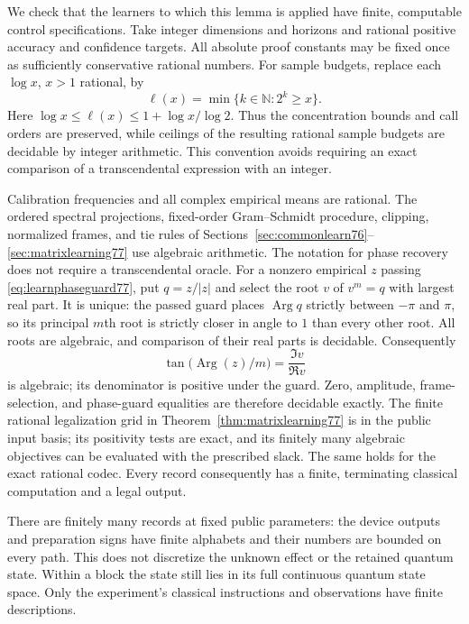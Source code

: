 We check that the learners to which this lemma is applied have
finite, computable control specifications.  Take integer dimensions
and horizons and rational positive accuracy and confidence targets.
All absolute proof constants may be fixed once as sufficiently
conservative rational numbers.  For sample budgets, replace each
$\log x$, $x>1$ rational, by
\[
 \ell(x)=\min\{k\in\mathbb N:2^k\ge x\}.
\]
Here $\log x\le\ell(x)\le1+\log x/\log2$.
Thus the concentration bounds and call orders are preserved, while
ceilings of the resulting rational sample budgets are decidable by
integer arithmetic.  This convention avoids requiring an exact
comparison of a transcendental expression with an integer.

Calibration frequencies and all complex empirical means are
rational.  The ordered spectral projections, fixed-order
Gram--Schmidt procedure, clipping, normalized frames, and tie rules
of Sections~\ref{sec:commonlearn76}--\ref{sec:matrixlearning77} use
algebraic arithmetic.  The notation for phase recovery does not
require a transcendental oracle.  For a nonzero empirical $z$ passing
\eqref{eq:learnphaseguard77}, put $q=z/|z|$ and select the root $v$
of $v^m=q$ with largest real part.  It is unique: the passed guard
places $\operatorname{Arg}q$ strictly between $-\pi$ and $\pi$,
so its principal $m$th root is strictly closer in angle to $1$
than every other root.  All roots are algebraic, and comparison of
their real parts is decidable.  Consequently
\[
 \tan\bigl(\operatorname{Arg}(z)/m\bigr)
       =\frac{\Im v}{\Re v}
\]
is algebraic; its denominator is positive under the guard.
Zero, amplitude, frame-selection, and phase-guard equalities are
therefore decidable exactly.  The finite rational legalization grid
in Theorem~\ref{thm:matrixlearning77} is in the public input basis;
its positivity tests are exact, and its finitely many algebraic
objectives can be evaluated with the prescribed slack.  The same
holds for the exact rational codec.  Every record consequently has
a finite, terminating classical computation and a legal output.

There are finitely many records at fixed public parameters: the
device outputs and preparation signs have finite alphabets and
their numbers are bounded on every path.  This does not discretize
the unknown effect or the retained quantum state.  Within a block
the state still lies in its full continuous quantum state space.
Only the experiment's classical instructions and observations have
finite descriptions.

